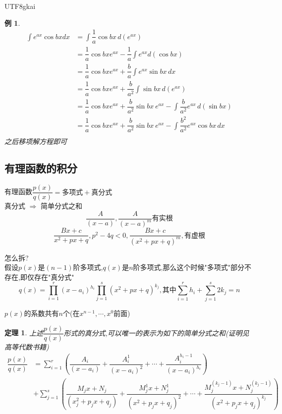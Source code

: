 \documentclass{article}
\newtheorem{theorem}{定理}[subsection]
\newtheorem{example}{例}[subsection]
\begin{document}
\begin{CJK}{UTF8}{gkai}
\begin{example}
  \[
  \begin{aligned}  
  \int e^{ax} \cos bx dx &= \int \dfrac{1}{a} \cos bx\, d(e^{ax}) \\
  &= \dfrac{1}{a} \cos bx e^{ax} - \dfrac{1}{a}\int e^{ax} d(\cos bx)  \\
  &= \dfrac{1}{a} \cos bx e^{ax} + \dfrac{b}{a}\int e^{ax} \sin bx \,dx\\
  &= \dfrac{1}{a} \cos bx e^{ax} + \dfrac{b}{a^2}\int  \sin bx \,d(e^{ax})\\
  &= \dfrac{1}{a} \cos bx e^{ax} + \dfrac{b}{a^2}\sin bx~ e^{ax} - \int \dfrac{b}{a^2} e^{ax} \,d(\sin bx)\\
  &= \dfrac{1}{a} \cos bx e^{ax} + \dfrac{b}{a^2}\sin bx~ e^{ax} - \int \dfrac{b^2}{a^2} e^{ax}\cos bx \,dx\\
  \end{aligned}
  \]
  之后移项解方程即可\\
\end{example}

\subsection{有理函数的积分}
有理函数$\dfrac{p(x)}{q(x)} = \text{多项式} + \text{真分式}$\\

真分式 $\Rightarrow$ 简单分式之和\\
\[\dfrac{A}{(x-a)},\dfrac{A}{(x-a)^m} \text{有实根}\]
\[\dfrac{Bx + c}{x^2 + px + q},p^2 - 4q < 0,\dfrac{Bx + c}{(x^2 + px + q)^m},\text{有虚根}\]

怎么拆?\\
假设$p(x)$是$(n-1)$阶多项式,$q(x)$是$n$阶多项式,那么这个时候"多项式"部分不存在,即仅存在"真分式"\\

\[q(x) = \prod_{i = 1}^r (x- a_i)^{h_i}\prod_{j = 1}^s (x^2 + px + q)^{k_j},\text{其中} \sum_{i = 1}^r h_i+ \sum_{j = 1}^s 2k_j = n\]

$p(x)$的系数共有$n$个(在$x^{n-1},\cdots, x^0$前面)\\

\begin{theorem}
上述$\dfrac{p(x)}{q(x)}$形式的真分式,可以唯一的表示为如下的简单分式之和(证明见高等代数书籍)
\[
\begin{aligned}  
\dfrac{p(x)}{q(x)} &= \sum_{i = 1}^r \left(\dfrac{A_i}{(x-a_i)} + \dfrac{A_i^{1}}{(x-a_i)^{2}} + \cdots + \dfrac{A_i^{h_i-1}}{(x-a_i)^{h_i}}\right) \\
&+ \sum_{j = 1}^s\left(\dfrac{M_j x + N_j }{(x_j^2 + p_j x + q_j)} + \dfrac{M_j^1 x + N_j^1 }{(x^2 + p_j x + q_j)^2} + \cdots +\dfrac{M_j^{(k_j -1)} x + N_j^{(k_j -1)} }{(x^2 + p_j  x + q_j)^{k_j}}\right)
\end{aligned}
\]
\end{theorem}


\end{CJK}
\end{document}
